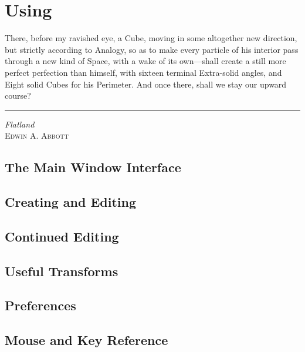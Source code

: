 \chapter{Using \dtypkghdr{}}
\label{chap:using_epspline}

\ifMKwx
	\small
	There, before my ravished eye, a Cube, moving in some
	altogether new direction, but strictly according to
	Analogy, so as to make every particle of his interior
	pass through a new kind of Space, with a wake of
	its own---shall create a still more perfect
	perfection than himself, with sixteen terminal
	Extra-solid angles, and Eight solid Cubes for his
	Perimeter. And once there, shall we stay
	our upward course?\\
	\hrule%
	\textit{Flatland}\\ \textsc{Edwin A. Abbott}
	\normalsize
\else
\fi %


	\section{The Main Window Interface}%
	\label{sec:window_interface}
	

	\section{Creating and Editing}%
	\label{sec:creat_editing}
	

	\section{Continued Editing}%
	\label{sec:cont_editing}
	

	\section{Useful Transforms}%
	\label{sec:useful_transforms}
	

	\section{Preferences}%
	\label{sec:ch_global_prefs}
	

	\section{Mouse and Key Reference}%
	\label{sec:mouse_key_ref}
	



